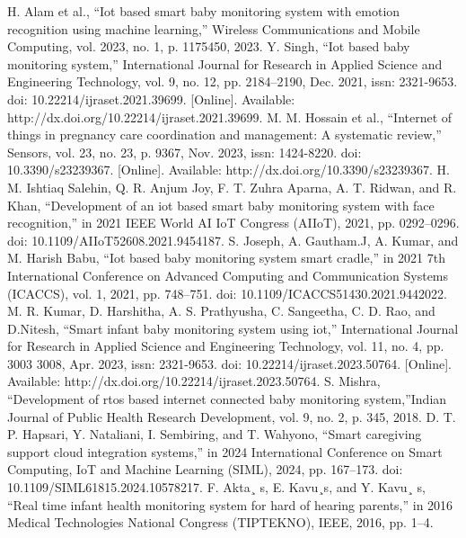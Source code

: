 \documentclass[conference]{IEEEtran}
\begin{document}

\begin{thebibliography}{00}
 H. Alam et al., “Iot based smart baby monitoring system with emotion recognition using machine learning,” Wireless Communications and Mobile Computing, vol. 2023, no. 1, p. 1175450, 2023.
 Y. Singh, “Iot based baby monitoring system,” International  Journal for Research in Applied Science and Engineering Technology, vol. 9, no. 12, pp. 2184–2190, Dec. 2021, issn: 2321-9653. doi: 10.22214/ijraset.2021.39699. [Online]. Available: http://dx.doi.org/10.22214/ijraset.2021.39699.
 M. M. Hossain et al., “Internet of things in pregnancy care coordination and management: A systematic review,” Sensors, vol. 23, no. 23, p. 9367, Nov. 2023, issn: 1424-8220. doi: 10.3390/s23239367. [Online]. Available: http://dx.doi.org/10.3390/s23239367.
 H. M. Ishtiaq Salehin, Q. R. Anjum Joy, F. T. Zuhra Aparna, A. T. Ridwan, and R. Khan, “Development of an iot based smart baby monitoring system with face recognition,” in 2021 IEEE World AI IoT Congress (AIIoT), 2021, pp. 0292–0296. doi: 10.1109/AIIoT52608.2021.9454187.
 S. Joseph, A. Gautham.J, A. Kumar, and M. Harish Babu, “Iot based baby monitoring system smart cradle,” in 2021 7th International Conference on Advanced Computing and Communication Systems (ICACCS), vol. 1, 2021, pp. 748–751. doi: 10.1109/ICACCS51430.2021.9442022.
 M. R. Kumar, D. Harshitha, A. S. Prathyusha, C. Sangeetha, C. D. Rao, and D.Nitesh, “Smart infant baby monitoring system using iot,” International Journal for Research in Applied Science and Engineering Technology, vol. 11, no. 4, pp. 3003 3008, Apr. 2023, issn: 2321-9653. doi: 10.22214/ijraset.2023.50764. [Online]. Available: http://dx.doi.org/10.22214/ijraset.2023.50764.
  S. Mishra, “Development of rtos based internet connected baby monitoring system,”Indian Journal of Public Health Research Development, vol. 9, no. 2, p. 345, 2018.
 D. T. P. Hapsari, Y. Nataliani, I. Sembiring, and T. Wahyono, “Smart caregiving support cloud integration systems,” in 2024 International Conference on Smart Computing, IoT and Machine Learning (SIML), 2024, pp. 167–173. doi: 10.1109/SIML61815.2024.10578217.
  F. Akta¸ s, E. Kavu¸s, and Y. Kavu¸ s, “Real time infant health monitoring system for hard of hearing parents,” in 2016 Medical Technologies National Congress (TIPTEKNO), IEEE, 2016, pp. 1–4.
\end{thebibliography}
\end{document}
